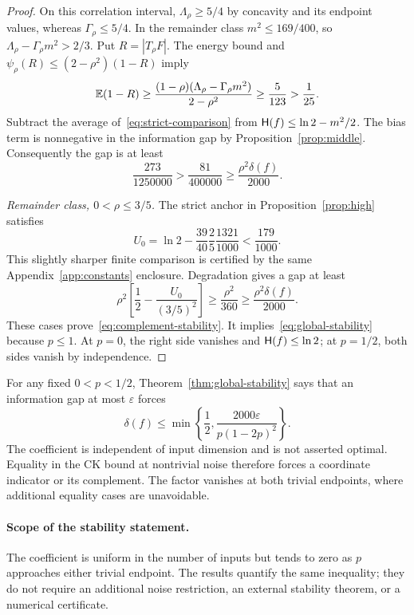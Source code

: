 \begin{proof}
On this correlation interval, $\Lambda_\rho\ge5/4$ by concavity and its endpoint values, whereas $\Gamma_\rho\le5/4$. In the remainder class $m^2\le169/400$, so $\Lambda_\rho-\Gamma_\rho m^2>2/3$. Put $R=|T_\rho F|$. The energy bound and $\psi_\rho(R)\le(2-\rho^2)(1-R)$ imply
\[
\mathbb E(1-R)\ge\frac{(1-\rho)(\Lambda_\rho-\Gamma_\rho m^2)}{2-\rho^2}
\ge\frac5{123}>\frac1{25}.
\]
Subtract the average of~\eqref{eq:strict-comparison} from $\mathsf H(f)\le\ln2-m^2/2$. The bias term is nonnegative in the information gap by Proposition~\ref{prop:middle}. Consequently the gap is at least
\[
\frac{273}{1250000}>\frac{81}{400000}\ge\frac{\rho^2\delta(f)}{2000}.
\]

\emph{Remainder class, $0<\rho\le3/5$.} The strict anchor in Proposition~\ref{prop:high} satisfies
\[
U_0=\ln2-\frac{39}{40}\frac25\frac{1321}{1000}<\frac{179}{1000}.
\]
This slightly sharper finite comparison is certified by the same Appendix~\ref{app:constants} enclosure. Degradation gives a gap at least
\[
\rho^2\left[\frac12-\frac{U_0}{(3/5)^2}\right]
\ge\frac{\rho^2}{360}\ge\frac{\rho^2\delta(f)}{2000}.
\]
These cases prove~\eqref{eq:complement-stability}. It implies~\eqref{eq:global-stability} because $p\le1$. At $p=0$, the right side vanishes and $\mathsf H(f)\le\ln2$; at $p=1/2$, both sides vanish by independence.
\end{proof}

For any fixed $0<p<1/2$, Theorem~\ref{thm:global-stability} says that an information gap at most $\varepsilon$ forces
\[
\delta(f)\le\min\left\{\frac12,\frac{2000\varepsilon}{p(1-2p)^2}\right\}.
\]
The coefficient is independent of input dimension and is not asserted optimal. Equality in the CK bound at nontrivial noise therefore forces a coordinate indicator or its complement. The factor vanishes at both trivial endpoints, where additional equality cases are unavoidable.

\paragraph{Scope of the stability statement.} The coefficient is uniform in the number of inputs but tends to zero as $p$ approaches either trivial endpoint. The results quantify the same inequality; they do not require an additional noise restriction, an external stability theorem, or a numerical certificate.